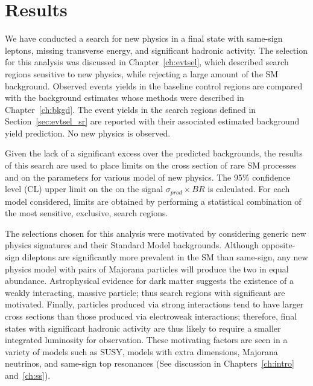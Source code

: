 \chapter{Results}
\label {ch:results}
We have conducted a search for new physics in a final state with same-sign
leptons, missing transverse energy, and significant hadronic activity. The
selection for this analysis was discussed in Chapter~\ref{ch:evtsel}, which
described search regions sensitive to new physics, while rejecting a large amount
of the SM background. Observed events yields in the baseline control regions
are compared with the background estimates whose methods were described in
Chapter~\ref{ch:bkgd}. The event yields in the search regions defined in
Section~\ref{sec:evtsel_sr} are reported with their associated estimated
background yield prediction. No new physics is observed.

Given the lack of a significant excess over the predicted backgrounds, the
results of this search are used to place limits on the cross section of rare
SM processes and on the parameters for various model of new physics. The 95\%
confidence level (CL) upper limit on the on the signal $\sigma_{prod} \times
BR$ is calculated. For each model considered, limits are obtained by performing
a statistical combination of the most sensitive, exclusive, search regions.

The selections chosen for this analysis were motivated by considering generic
new physics signatures and their Standard Model backgrounds. Although
opposite-sign dileptons are significantly more prevalent in the SM than
same-sign, any new physics model with pairs of Majorana particles will produce
the two in equal abundance. Astrophysical evidence for dark matter suggests
the existence of a weakly interacting, massive particle; thus search regions
with significant \met are motivated. Finally, particles produced via strong
interactions tend to have larger cross sections than those produced via
electroweak interactions; therefore, final states with significant hadronic
activity are thus likely to require a smaller integrated luminosity for
observation. These motivating factors are seen in a variety of models such
as SUSY, models with extra dimensions, Majorana neutrinos, and same-sign top
resonances (See discussion in Chapters~\ref{ch:intro} and~\ref{ch:ss}).

